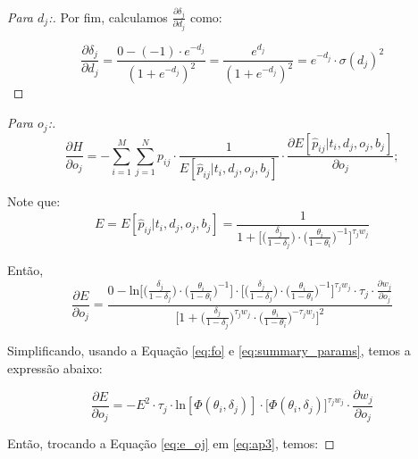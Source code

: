 \begin{proof}[Para $d_j$:]
    \noindent Por fim, calculamos $\frac{\partial \delta_j}{\partial d_j}$ como:

    \begin{equation}
            \frac{\partial \delta_j}{\partial d_j} = \frac{0 - (-1)\cdot e^{-d_j}}{(1 + e^{-d_j})^{2}} = \frac{e^{d_j}}{(1 + e^{-d_j})^{2}} = e^{-d_j}\cdot\sigma(d_j)^{2}
    \end{equation}

\end{proof}

\begin{proof}[Para $o_j$:]
    \begin{equation}
        \label{eq:ap3}
            \frac{\partial H}{\partial o_j} = - \sum_{i=1}^{M}\sum_{j=1}^{N} p_{ij}\cdot \frac{1}{E[\hat{p}_{ij} | t_i, d_j, o_j, b_j]} \cdot \frac{\partial E[\hat{p}_{ij} | t_i, d_j, o_j, b_j]}{\partial o_j};
    \end{equation}
    
    \noindent Note que:
    \begin{equation}
        E = E[\hat{p}_{ij} | t_i, d_j, o_j, b_j] = \frac{1}{1 + \bigg[\big(\frac{\delta_j}{1 - \delta_j}\big)\cdot \big(\frac{\theta_i}{1 - \theta_i}\big)^{-1}\bigg]^{\tau_j w_j}}
    \end{equation}
    
    \noindent Então,
    \begin{equation}
        \frac{\partial E}{\partial o_j} = \frac{0 - \text{ln}\big[\big(\frac{\delta_j}{ 1 - \delta_j}\big)\cdot \big(\frac{\theta_i}{ 1 - \theta_i}\big)^{-1}\big] \cdot \big[\big(\frac{\delta_j}{ 1 - \delta_j}\big)\cdot \big(\frac{\theta_i}{ 1 - \theta_i}\big)^{-1}\big]^{\tau_j w_j} \cdot \tau_j \cdot\frac{\partial w_j}{\partial o_j}}{\big[ 1 + \big(\frac{\delta_j}{1 - \delta_j}\big)^{\tau_j w_j}\cdot\big(\frac{\theta_i}{1 - \theta_i}\big)^{-\tau_j w_j}\big]^{2}}
    \end{equation}
    
    \noindent Simplificando, usando a Equação \ref{eq:fo} e \ref{eq:summary_params}, temos a expressão abaixo:
    
    \begin{equation}
        \label{eq:e_oj}    
        \frac{\partial E}{\partial o_j} = - E^{2}\cdot \tau_j \cdot \text{ln}[\Phi(\theta_i, \delta_j)] \cdot \big[\Phi(\theta_i, \delta_j)]^{\tau_j w_j} \cdot \frac{\partial w_j}{\partial o_j}
    \end{equation}
    
    \noindent Então, trocando a Equação \ref{eq:e_oj} em \ref{eq:ap3}, temos:


\end{proof}
